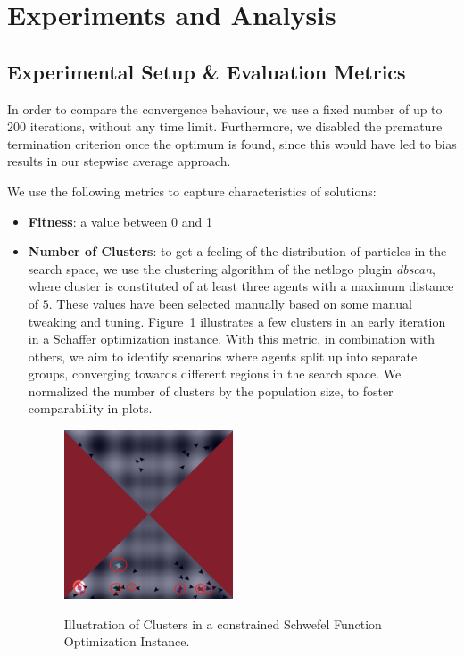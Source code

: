 \documentclass[12pt]{article}
\begin{document}
\section{Experiments and Analysis}
\subsection{Experimental Setup \& Evaluation Metrics}
In order to compare the convergence behaviour, we use a fixed number of up to $200$ iterations, without any time limit. Furthermore, we disabled the premature termination criterion once the optimum is found, since this would have led to bias results in our stepwise average approach. 

We use the following metrics to capture characteristics of solutions:
\begin{itemize}
	\item \textbf{Fitness}: a value between 0 and 1
	\item \textbf{Number of Clusters}: to get a feeling of the distribution of particles in the search space, we use the clustering algorithm of the netlogo plugin \emph{dbscan}, where cluster is constituted of at least three agents with a maximum distance of $5$. These values have been selected manually based on some manual tweaking and tuning. Figure~\ref{fig:clusters} illustrates a few clusters in an early iteration in a Schaffer optimization instance. With this metric, in combination with others, we aim to identify scenarios where agents split up into separate groups, converging towards different regions in the search space. We normalized the number of clusters by the population size, to foster comparability in plots. 
	
	\begin{figure}[h]
	\centering
		\includegraphics[width=5cm]{figures/clusters.png}
		\label{fig:clusters}
		\caption{Illustration of Clusters in a constrained Schwefel Function Optimization Instance.}
	\end{figure}	
	

\end{itemize}
\end{document}
